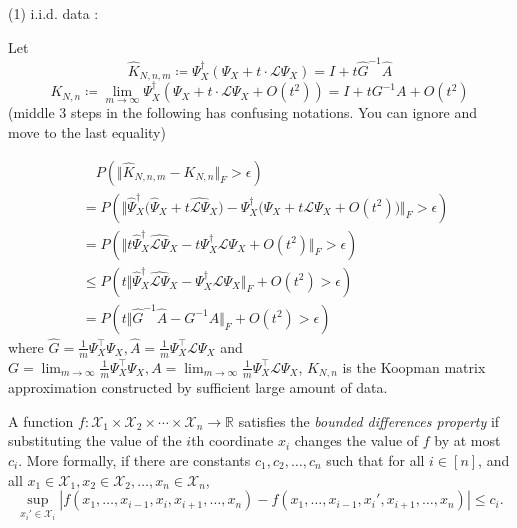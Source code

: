 \documentclass{article}[11]
\begin{document}
	(1) i.i.d. data :
	
	Let $$\widehat{K}_{N,n,m} \coloneqq \Psi_X^{\dagger}(\Psi_X + t \cdot \mathcal{L}\Psi_X) = I+t \widehat{G}^{-1} \widehat{A}$$
	$$K_{N,n} \coloneqq \lim_{m\to\infty}\Psi_X^{\dagger}(\Psi_X + t \cdot \mathcal{L}\Psi_X + O(t^2)) = I + t G^{-1}A + O(t^2)$$
	(middle 3 steps in the following has confusing notations. You can ignore and move to the last equality)
	
	\begin{align*}
		&\quad P\left(\Vert \widehat{K}_{N,n,m} - K_{N,n} \Vert_F > \epsilon \right) \\
		&= P\left(\Vert \widehat{\Psi}_X^{\dagger}\big(\widehat{\Psi}_X + t \widehat{\mathcal{L}\Psi}_X \big) - \Psi_X^{\dagger}\big(\Psi_X + t\mathcal{L}\Psi_{X} + O(t^2) \big) \Vert_F > \epsilon \right) \\
		&= P\left(\Vert t\widehat{\Psi}_X^{\dagger} \widehat{\mathcal{L}\Psi}_X - t\Psi_X^{\dagger}\mathcal{L}\Psi_{X} + O(t^2) \Vert_F > \epsilon \right) \\
		&\leq P\left( t\Vert \widehat{\Psi}_X^{\dagger} \widehat{\mathcal{L}\Psi}_X - \Psi_X^{\dagger}\mathcal{L}\Psi_{X} \Vert_F + O(t^2) > \epsilon \right) \\
		&= P\left( t\Vert \widehat{G}^{-1} \widehat{A} - G^{-1}A \Vert_F + O(t^2) > \epsilon \right)
	\end{align*}
	where $\widehat{G} = \frac{1}{m}\Psi_X^\top \Psi_X, \widehat{A} = \frac{1}{m}\Psi_X^\top \mathcal{L}\Psi_{X}$ and $G = \lim_{m\to\infty}\frac{1}{m}\Psi_X^\top \Psi_X, A = \lim_{m\to\infty}\frac{1}{m}\Psi_X^\top \mathcal{L}\Psi_{X}$, $K_{N,n}$ is the Koopman matrix approximation constructed by sufficient large amount of data.
	
	
	A function $f : \mathcal{X}_1 \times \mathcal{X}_2 \times \cdots \times \mathcal{X}_n \to \mathbb{R}$ satisfies the \textit{bounded differences property} if substituting the value of the $i$th coordinate $x_i$ changes the value of $f$ by at most $c_i$. More formally, if there are constants $c_1, c_2, \ldots, c_n$ such that for all $i \in [n]$, and all $x_1 \in \mathcal{X}_1, x_2 \in \mathcal{X}_2, \ldots, x_n \in \mathcal{X}_n$,
	\[
	\sup_{x_i' \in \mathcal{X}_i} |f(x_1, \ldots, x_{i-1}, x_i, x_{i+1}, \ldots, x_n) - f(x_1, \ldots, x_{i-1}, x_i', x_{i+1}, \ldots, x_n)| \leq c_i.
	\]
	
	
\end{document}
